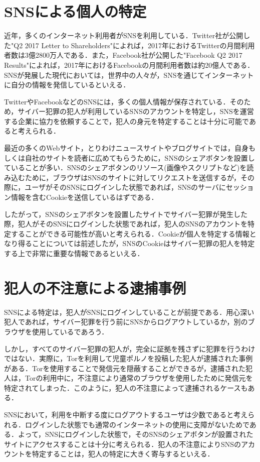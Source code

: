 \documentclass[10pt, a4paper]{jreport}
\begin{document}
\section{SNSによる個人の特定}
近年，多くのインターネット利用者がSNSを利用している．Twitter社が公開した"Q2 2017 Letter to Shareholders"によれば，2017年におけるTwitterの月間利用者数は3億2800万人である．また，Facebook社が公開した"Facebook Q2 2017 Results"によれば，2017年におけるFacebookの月間利用者数は約20億人である．SNSが発展した現代においては，世界中の人々が，SNSを通じてインターネットに自分の情報を発信しているといえる．

TwitterやFacebookなどのSNSには，多くの個人情報が保存されている．そのため，サイバー犯罪の犯人が利用しているSNSのアカウントを特定し，SNSを運営する企業に協力を依頼することで，犯人の身元を特定することは十分に可能であると考えられる．

最近の多くのWebサイト，とりわけニュースサイトやブログサイトでは，自身もしくは自社のサイトを読者に広めてもらうために，SNSのシェアボタンを設置していることが多い．SNSのシェアボタンのリソース(画像やスクリプトなど)を読み込むために，ブラウザはSNSのサイトに対してリクエストを送信するが，その際に，ユーザがそのSNSにログインした状態であれば，SNSのサーバにセッション情報を含むCookieを送信しているはずである．

したがって，SNSのシェアボタンを設置したサイトでサイバー犯罪が発生した際，犯人がそのSNSにログインした状態であれば，犯人のSNSのアカウントを特定することができる可能性が高いと考えられる．Cookieが個人を特定する情報となり得ることについては前述したが，SNSのCookieはサイバー犯罪の犯人を特定する上で非常に重要な情報であるといえる．

\section{犯人の不注意による逮捕事例}
SNSによる特定は，犯人がSNSにログインしていることが前提である．用心深い犯人であれば，サイバー犯罪を行う前にSNSからログアウトしているか，別のブラウザを使用しているであろう．

しかし，すべてのサイバー犯罪の犯人が，完全に証拠を残さずに犯罪を行うわけではない．実際に，Torを利用して児童ポルノを投稿した犯人が逮捕された事例がある．Torを使用することで発信元を隠蔽することができるが，逮捕された犯人は，Torの利用中に，不注意により通常のブラウザを使用したために発信元を特定されてしまった．このように，犯人の不注意によって逮捕されるケースもある．

SNSにおいて，利用を中断する度にログアウトするユーザは少数であると考えられる．ログインした状態でも通常のインターネットの使用に支障がないためである．よって，SNSにログインした状態で，そのSNSのシェアボタンが設置されたサイトにアクセスすることは十分に考えられる．犯人の不注意によりSNSのアカウントを特定することは，犯人の特定に大きく寄与するといえる．
\end{document}
